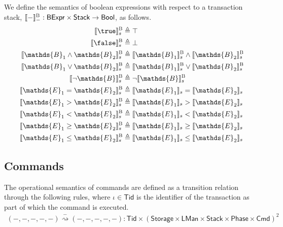 We define the semantics of boolean expressions with respect to a transaction stack, $\llbracket - \rrbracket_-^\textsc{B} : \mathsf{BExpr} \times \mathsf{Stack} \rightarrow \mathsf{Bool}$, as follows.
\begin{align*}
\llbracket \true \rrbracket_s^\textsc{B} &\triangleq \top \\
\llbracket \false \rrbracket_s^\textsc{B} &\triangleq \bot \\
\llbracket \mathds{B}_1 \land \mathds{B}_2 \rrbracket_s^\textsc{B} &\triangleq \llbracket \mathds{B}_1 \rrbracket_s^\textsc{B} \land \llbracket \mathds{B}_2 \rrbracket_s^\textsc{B} \\
\llbracket \mathds{B}_1 \lor \mathds{B}_2 \rrbracket_s^\textsc{B} &\triangleq \llbracket \mathds{B}_1 \rrbracket_s^\textsc{B} \lor \llbracket \mathds{B}_2 \rrbracket_s^\textsc{B} \\
\llbracket \lnot \mathds{B} \rrbracket_s^\textsc{B} &\triangleq \lnot \llbracket \mathds{B} \rrbracket_s^\textsc{B} \\
\llbracket \mathds{E}_1 = \mathds{E}_2 \rrbracket_s^\textsc{B} &\triangleq \llbracket \mathds{E}_1 \rrbracket_s = \llbracket \mathds{E}_2 \rrbracket_s \\
\llbracket \mathds{E}_1 > \mathds{E}_2 \rrbracket_s^\textsc{B} &\triangleq \llbracket \mathds{E}_1 \rrbracket_s > \llbracket \mathds{E}_2 \rrbracket_s \\
\llbracket \mathds{E}_1 < \mathds{E}_2 \rrbracket_s^\textsc{B} &\triangleq \llbracket \mathds{E}_1 \rrbracket_s < \llbracket \mathds{E}_2 \rrbracket_s \\
\llbracket \mathds{E}_1 \geq \mathds{E}_2 \rrbracket_s^\textsc{B} &\triangleq \llbracket \mathds{E}_1 \rrbracket_s \geq \llbracket \mathds{E}_2 \rrbracket_s \\
\llbracket \mathds{E}_1 \leq \mathds{E}_2 \rrbracket_s^\textsc{B} &\triangleq \llbracket \mathds{E}_1 \rrbracket_s \leq \llbracket \mathds{E}_2 \rrbracket_s \\
\end{align*}

\subsection{Commands}

The operational semantics of commands are defined as a transition relation through the following rules, where $\iota \in \mathsf{Tid}$ is the identifier of the transaction as part of which the command is executed.
\begin{gather*}
(-, -, -, -, -) \overset{-}{\rightsquigarrow} (-, -, -, -, -) 
: \mathsf{Tid} \times (\mathsf{Storage} \times \mathsf{LMan} \times \mathsf{Stack} \times \mathsf{Phase} \times \mathsf{Cmd})^2
\end{gather*}


